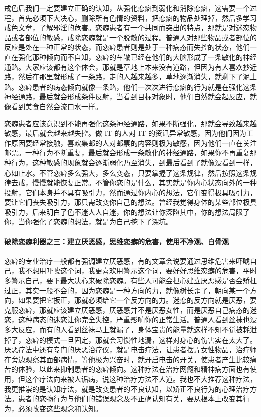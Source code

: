 戒色后我们一定要建立正确的认知，从强化恋癖到弱化和消除恋癖，这需要一个过程，首先必须下大决心，删除所有色情的资料，把恋癖的物品处理掉，然后多学习戒色文章，了解邪淫的危害。恋癖患者有一个共同而突出的特点，那就是对迷恋物品或者部位的敏感，戒除恋癖就是一个脱敏的过程。普通人对那些物品或者部位的反应是处在一种正常的状态，而恋癖患者则是处于一种病态而失控的状态，他们一直在强化那种倾向而不自知，恋癖的车辙已经在他们的大脑形成了一条敏化的神经通路。大家应该都有这个体会，那就是草地上本来没有道路，但因为有人喜欢抄近路，然后在那里就形成了一条路，走的人越来越多，草地逐渐消失，就剩下了泥土路。恋癖患者的病态倾向就像一条路，他们一次次进行恋癖的行为就是在强化这条神经通路，最后就会形成条件反射，当看到目标对象时，他们自然就会起反应，就像看到美食自然会流口水一样。

恋癖患者应该意识到不能再强化这条神经通路，如果不断强化，那就会导致越来越敏感，最后就会越来越失控。做 IT 的人对 IT 的资讯异常敏感，因为他们因为工作原因要经常接触，喜欢集邮的人对邮票的内容则极为敏感，因为他们一直在关注邮票。一种行为不断重复，最后就会形成一条敏化的神经通路，如果你不再重复那种行为，这种敏感的现象就会逐渐弱化乃至消失，到最后看到了就像没看到一样，心如止水。不管恋癖多么强大，多么变态，只要掌握了这条规律，然后按照这条规律去戒，慢慢就能恢复正常。不管你恋的是什么，其实就是你内心状态向外的一种投射，它们本身并不具有吸引力，然而通过你内心的想法，它们变得极具吸引力，要让它们丧失吸引力，那只需改变你自己的想法。曾经我觉得身体的某些部位极具吸引力，后来明白了色不迷人人自迷，你的想法让你深陷其中，你的想法局限了你，当你强化了恋癖的想法，就是为自己挖下了深坑。

\paragraph{破除恋癖利器之三：建立厌恶感，思维恋癖的危害，使用不净观、白骨观}

恋癖的专业治疗一般都有强调建立厌恶感，有的文章会说要通过思维危害来吓唬自己，我不想用吓唬这个词，我更喜欢用警示这个词，要好好思维恋癖的危害，平时多警示自己，要下最大决心来破除恋癖。有些人可能会担心建立厌恶感是否会矫枉过正，其实一般不会的，因为恋癖是一种方向的力，就像树长歪了，朝向某一个方向，如果要把它扳正，那就必须给它一个反方向的力。迷恋的反方向就是厌恶，要克服恋癖，那就应该建立厌恶感，厌恶感并不是厌恶女性，而是厌恶自己病态的迷恋，这种病态的迷恋让你完全失控，严重影响你的正常生活。普通人看到丝袜也没多大反应，而有的人看到丝袜马上就漏了，身体宝贵的能量就这样不知不觉被耗泄掉了，恋癖的模式一旦固定，那就会习惯性地漏，这样对身心的伤害实在太大了。厌恶疗法中还有专门的厌恶治疗仪，就是电击疗法，让患者摆弄女性物品，治疗师在旁边观察其面部病情，等他极为兴奋时，就开启电击的开关，使患者产生比较痛苦的体验，以此来抑制患者的恋癖倾向。这种疗法在治疗网瘾和精神病方面也有使用，但这个疗法向来被人诟病，说这种治疗方法不人道。我也不大推荐这种疗法，我更推崇的是认知疗法，就是改变患者的不良认知，以矫正不良行为的心理治疗方法。患者的恋物行为与他们的错误观念及不正确认知有关，要从根本上改变其行为，必须改变这些观念和认知。

